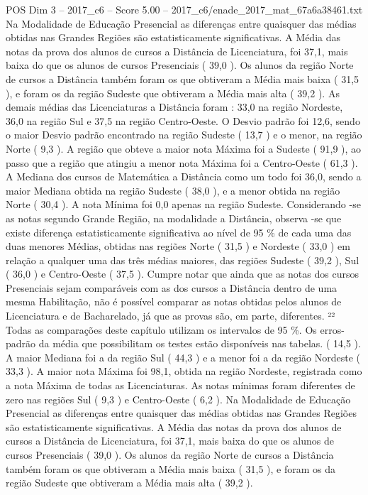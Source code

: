 \begin{textsample}{POS Dim 3 – 2017\_c6 – Score 5.00 – 2017\_c6/enade\_2017\_mat\_67a6a38461.txt}
Na Modalidade de Educação Presencial as diferenças entre quaisquer das médias obtidas nas Grandes Regiões são estatisticamente significativas.
A Média das notas da prova dos alunos de cursos a Distância de Licenciatura, foi 37,1, mais baixa do que os alunos de cursos Presenciais ( 39,0 ).
Os alunos da região Norte de cursos a Distância também foram os que obtiveram a Média mais baixa ( 31,5 ), e foram os da região Sudeste que obtiveram a Média mais alta ( 39,2 ).
As demais médias das Licenciaturas a Distância foram : 33,0 na região Nordeste, 36,0 na região Sul e 37,5 na região Centro-Oeste.
O Desvio padrão foi 12,6, sendo o maior Desvio padrão encontrado na região Sudeste ( 13,7 ) e o menor, na região Norte ( 9,3 ).
A região que obteve a maior nota Máxima foi a Sudeste ( 91,9 ), ao passo que a região que atingiu a menor nota Máxima foi a Centro-Oeste ( 61,3 ).
A Mediana dos cursos de Matemática a Distância como um todo foi 36,0, sendo a maior Mediana obtida na região Sudeste ( 38,0 ), e a menor obtida na região Norte ( 30,4 ).
A nota Mínima foi 0,0 apenas na região Sudeste.
Considerando -se as notas segundo Grande Região, na modalidade a Distância, observa -se que existe diferença estatisticamente significativa ao nível de 95 \% de cada uma das duas menores Médias, obtidas nas regiões Norte ( 31,5 ) e Nordeste ( 33,0 ) em relação a qualquer uma das três médias maiores, das regiões Sudeste ( 39,2 ), Sul ( 36,0 ) e Centro-Oeste ( 37,5 ).
Cumpre notar que ainda que as notas dos cursos Presenciais sejam comparáveis com as dos cursos a Distância dentro de uma mesma Habilitação, não é possível comparar as notas obtidas pelos alunos de Licenciatura e de Bacharelado, já que as provas são, em parte, diferentes. ²² Todas as comparações deste capítulo utilizam os intervalos de 95 \%.
Os erros-padrão da média que possibilitam os testes estão disponíveis nas tabelas. ( 14,5 ).
A maior Mediana foi a da região Sul ( 44,3 ) e a menor foi a da região Nordeste ( 33,3 ).
A maior nota Máxima foi 98,1, obtida na região Nordeste, registrada como a nota Máxima de todas as Licenciaturas.
As notas mínimas foram diferentes de zero nas regiões Sul ( 9,3 ) e Centro-Oeste ( 6,2 ).
Na Modalidade de Educação Presencial as diferenças entre quaisquer das médias obtidas nas Grandes Regiões são estatisticamente significativas.
A Média das notas da prova dos alunos de cursos a Distância de Licenciatura, foi 37,1, mais baixa do que os alunos de cursos Presenciais ( 39,0 ).
Os alunos da região Norte de cursos a Distância também foram os que obtiveram a Média mais baixa ( 31,5 ), e foram os da região Sudeste que obtiveram a Média mais alta ( 39,2 ).

\end{textsample}
